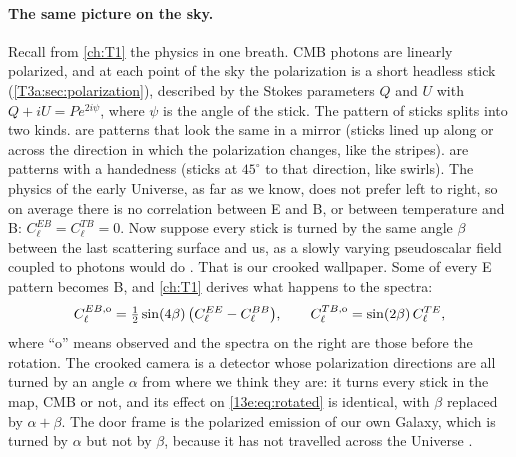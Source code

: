 \paragraph{The same picture on the sky.} Recall from \cref{ch:T1} the physics in one breath. CMB photons
are linearly polarized, and at each point of the sky the polarization is a short headless stick
(\cref{T3a:sec:polarization}), described by the Stokes parameters $Q$ and $U$ with $Q+iU=Pe^{2i\psi}$, where
$\psi$ is the angle of the stick. The pattern of sticks splits into two kinds.  are
patterns that look the same in a mirror (sticks lined up along or across the direction in which the
polarization changes, like the stripes).  are patterns with a handedness (sticks at
$45^\circ$ to that direction, like swirls). The physics of the early Universe, as far as we know, does not
prefer left to right, so on average there is no correlation between E and B, or between temperature and
B: $C^{EB}_\ell=C^{TB}_\ell=0$. Now suppose every stick is turned by the same angle $\beta$ between the last
scattering surface and us, as a slowly varying pseudoscalar field coupled to photons would do
\cite{MinamiKomatsu2020}. That is our crooked wallpaper. Some of every E pattern becomes B, and
\cref{ch:T1} derives what happens to the spectra:
\begin{equation}
  C^{EB,{\rm o}}_\ell=\tfrac12\sin(4\beta)\,\bigl(C^{EE}_\ell-C^{BB}_\ell\bigr),\qquad
  C^{TB,{\rm o}}_\ell=\sin(2\beta)\,C^{TE}_\ell ,
  \label{13e:eq:rotated}
\end{equation}
where ``o'' means observed and the spectra on the right are those before the rotation. The crooked camera
is a detector whose polarization directions are all turned by an angle $\alpha$ from where we think they
are: it turns every stick in the map, CMB or not, and its effect on \eqref{13e:eq:rotated} is identical,
with $\beta$ replaced by $\alpha+\beta$. The door frame is the polarized emission of our own Galaxy, which
is turned by $\alpha$ but not by $\beta$, because it has not travelled across the Universe
\cite{Minami2019}.


